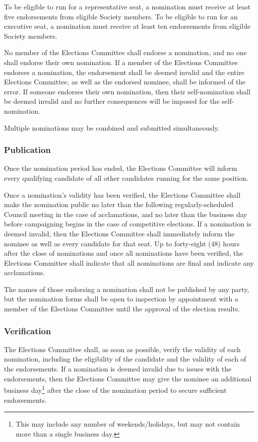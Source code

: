 To be eligible to run for a representative seat, a nomination must receive at least five endorsements from eligible Society members.
To be eligible to run for an executive seat, a nomination must receive at least ten endorsements from eligible Society members.

No member of the Elections Committee shall endorse a nomination, and no one shall endorse their own nomination.
If a member of the Elections Committee endorses a nomination, the endorsement shall be deemed invalid and the entire Elections Committee, as well as the endorsed nominee, shall be informed of the error.
If someone endorses their own nomination, then their self-nomination shall be deemed invalid and no further consequences will be imposed for the self-nomination.

Multiple nominations may be combined and submitted simultaneously.

\subsubsection{Publication}
Once the nomination period has ended, the Elections Committee will inform every qualifying candidate of all other candidates running for the same position.

Once a nomination's validity has been verified, the Elections Committee shall make the nomination public no later than the following regularly-scheduled Council meeting in the case of acclamations, and no later than the business day before campaigning begins in the case of competitive elections.
If a nomination is deemed invalid, then the Elections Committee shall immediately inform the nominee as well as every candidate for that seat.
Up to forty-eight (48) hours after the close of nominations and once all nominations have been verified, the Elections Committee shall indicate that all nominations are final and indicate any acclamations.

The names of those endorsing a nomination shall not be published by any party, but the nomination forms shall be open to inspection by appointment with a member of the Elections Committee until the approval of the election results.

\subsubsection{Verification}

The Elections Committee shall, as soon as possible, verify the validity of each nomination, including the eligibility of the candidate and the validity of each of the endorsements.
If a nomination is deemed invalid due to issues with the endorsements, then the Elections Committee may give the nominee an additional business day\footnote{This may include any number of weekends/holidays, but may not contain more than a single business day.} after the close of the nomination period to secure sufficient endorsements.

